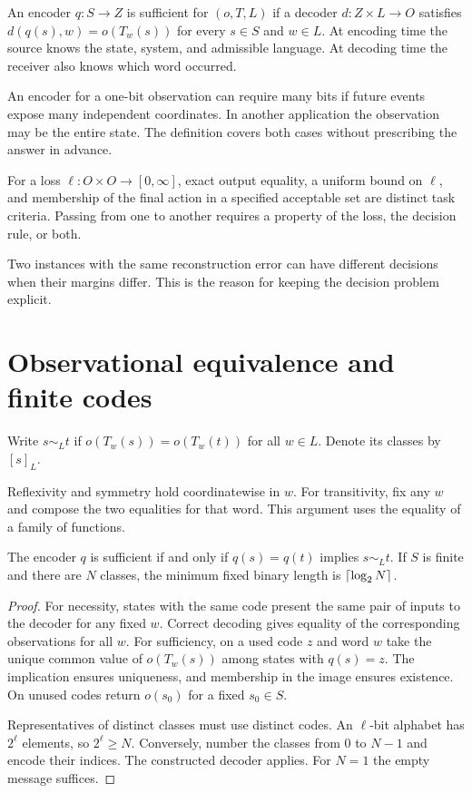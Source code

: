 \begin{definition}\label{def:sufficient}
An encoder $q:S\to Z$ is sufficient for $(o,T,L)$ if a decoder $d:Z\times L\to O$ satisfies $d(q(s),w)=o(T_w(s))$ for every $s\in S$ and $w\in L$. At encoding time the source knows the state, system, and admissible language. At decoding time the receiver also knows which word occurred.
\end{definition}
An encoder for a one-bit observation can require many bits if future events expose many independent coordinates. In another application the observation may be the entire state. The definition covers both cases without prescribing the answer in advance.

\begin{definition}
For a loss $\ell:O\times O\to[0,\infty]$, exact output equality, a uniform bound on $\ell$, and membership of the final action in a specified acceptable set are distinct task criteria. Passing from one to another requires a property of the loss, the decision rule, or both.
\end{definition}
Two instances with the same reconstruction error can have different decisions when their margins differ. This is the reason for keeping the decision problem explicit.

\section{Observational equivalence and finite codes}\label{sec:finite}
\begin{definition}
Write $s\sim_L t$ if $o(T_w(s))=o(T_w(t))$ for all $w\in L$. Denote its classes by $[s]_L$.
\end{definition}
Reflexivity and symmetry hold coordinatewise in $w$. For transitivity, fix any $w$ and compose the two equalities for that word. This argument uses the equality of a family of functions.

\begin{theorem}\label{thm:factor}
The encoder $q$ is sufficient if and only if $q(s)=q(t)$ implies $s\sim_Lt$. If $S$ is finite and there are $N$ classes, the minimum fixed binary length is $\left\lceil \log_2 N\right\rceil$.
\end{theorem}
\begin{proof}
For necessity, states with the same code present the same pair of inputs to the decoder for any fixed $w$. Correct decoding gives equality of the corresponding observations for all $w$. For sufficiency, on a used code $z$ and word $w$ take the unique common value of $o(T_w(s))$ among states with $q(s)=z$. The implication ensures uniqueness, and membership in the image ensures existence. On unused codes return $o(s_0)$ for a fixed $s_0\in S$.

Representatives of distinct classes must use distinct codes. An $\ell$-bit alphabet has $2^\ell$ elements, so $2^\ell\ge N$. Conversely, number the classes from $0$ to $N-1$ and encode their indices. The constructed decoder applies. For $N=1$ the empty message suffices.
\end{proof}


